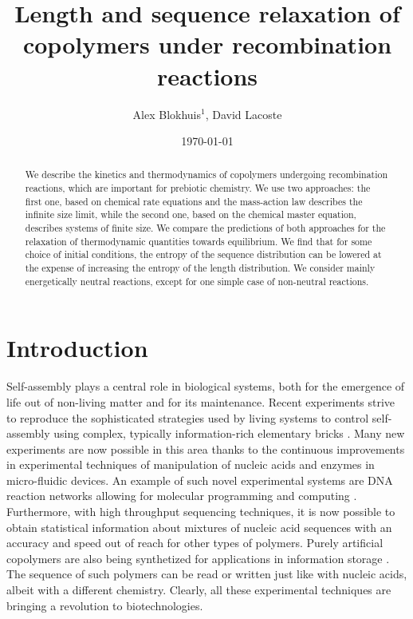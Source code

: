 \documentclass[
	amsmath,
	amssymb,
	a4paper,
	aip,		%
	jcp,		%
	reprint, twocolumn  %
	fleqn,
	showpacs,
	floatfix
]{revtex4-1}
\begin{document}
\title{Length and sequence relaxation of copolymers under recombination reactions}


\author{Alex Blokhuis$^1$, David Lacoste}
\date{\today} 

\begin{abstract}
We describe the kinetics and thermodynamics of copolymers undergoing recombination reactions, which are important
for prebiotic chemistry. We use two approaches: the first one, based on chemical rate equations and the mass-action law describes 
the infinite size limit, while the second one, based on the chemical master equation,
describes systems of finite size. We compare the predictions of both approaches for the 
relaxation of thermodynamic quantities towards equilibrium. 
We find that for some choice of initial conditions, the entropy of the sequence distribution can be lowered
at the expense of increasing the entropy of the length distribution.
We consider mainly energetically neutral reactions, except for one simple case of non-neutral reactions. 
\end{abstract}


\maketitle



\section{Introduction}

Self-assembly plays a central role in biological systems, both for the emergence of life out of non-living matter 
and for its maintenance. Recent experiments strive to reproduce the sophisticated 
strategies used by living systems to
control self-assembly using complex, typically information-rich elementary bricks \cite{Murugan2015}. 
Many new experiments are now 
possible in this area thanks to the continuous improvements in experimental techniques of 
manipulation of nucleic acids and enzymes in micro-fluidic devices. An example of such novel experimental systems are
DNA reaction networks allowing for molecular programming  and computing  \cite{Gines2017, Zhang2007}.
Furthermore, with high throughput sequencing techniques, it is now possible to 
obtain statistical information about mixtures of nucleic acid sequences with 
an accuracy and speed out of reach for other types of polymers.
Purely artificial copolymers are also being synthetized for applications in information storage \citep{Badi09,Lutz13}. 
The sequence of such polymers can be read or written just like with nucleic acids, albeit with a different chemistry. 
Clearly, all these experimental techniques are bringing a revolution to biotechnologies.
\end{document}
